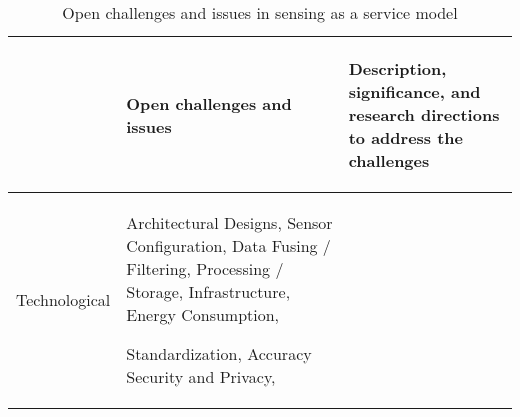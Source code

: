 \documentclass[times]{ettauth}
\newenvironment{noindlist}
 {\begin{list}{\labelitemi}{\leftmargin=1.2em \itemindent=-.5em}}
 {\end{list}}
\begin{document}
\begin{table*}[t]
\centering
\small


\renewcommand{\arraystretch}{-4}
\caption{Open challenges and issues in sensing as a service model}
\vspace{-0.3cm} 
\begin{tabular}{ m{0.05cm} m{2.0cm} m{12cm}  }

\hline  
   \multicolumn{1}{r}{}   &    
\begin{center} Open challenges and issues \end{center} & 
\begin{center} Description, significance, and research directions to address the challenges
 \end{center} 


\\ \hline \hline 
  



\begin{sideways}Technological\end{sideways}     
&   \begin{noindlist}
 		 \item Architectural Designs, \newline Sensor Configuration, \newline Data Fusing / Filtering,
 		 \newline Processing / Storage, \newline
 		 Infrastructure, \newline Energy Consumption,\newline
 		 \vspace{60pt}
 		 \item Standardization, \newline  Accuracy \newline Security and Privacy,  


\end{noindlist}
\end{tabular}
\end{table*}
\end{document}
